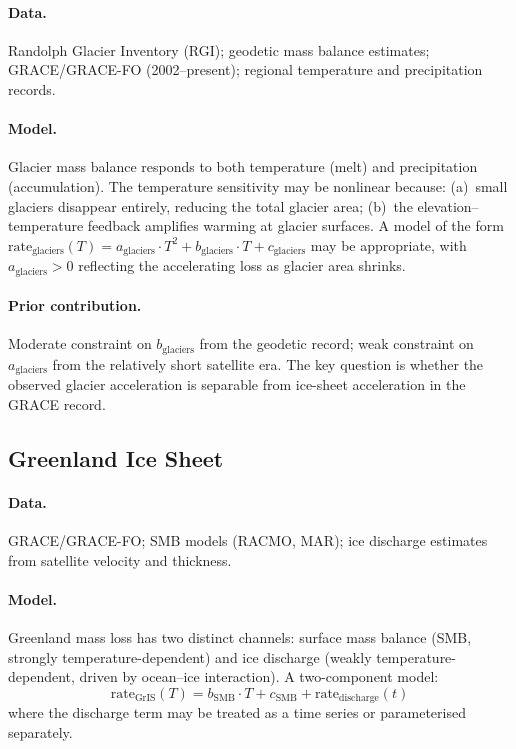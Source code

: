\documentclass[11pt]{article}
\begin{document}
\paragraph{Data.}  Randolph Glacier Inventory (RGI); geodetic mass balance estimates; GRACE/GRACE-FO (2002--present); regional temperature and precipitation records.

\paragraph{Model.}  Glacier mass balance responds to both temperature (melt) and precipitation (accumulation).  The temperature sensitivity may be nonlinear because: (a)~small glaciers disappear entirely, reducing the total glacier area; (b)~the elevation--temperature feedback amplifies warming at glacier surfaces.  A model of the form $\text{rate}_{\text{glaciers}}(T) = a_{\text{glaciers}} \cdot T^2 + b_{\text{glaciers}} \cdot T + c_{\text{glaciers}}$ may be appropriate, with $a_{\text{glaciers}} > 0$ reflecting the accelerating loss as glacier area shrinks.

\paragraph{Prior contribution.}  Moderate constraint on $b_{\text{glaciers}}$ from the geodetic record; weak constraint on $a_{\text{glaciers}}$ from the relatively short satellite era.  The key question is whether the observed glacier acceleration is separable from ice-sheet acceleration in the GRACE record.

\subsection{Greenland Ice Sheet}
\label{sec:gris}

\paragraph{Data.}  GRACE/GRACE-FO; SMB models (RACMO, MAR); ice discharge estimates from satellite velocity and thickness.

\paragraph{Model.}  Greenland mass loss has two distinct channels: surface mass balance (SMB, strongly temperature-dependent) and ice discharge (weakly temperature-dependent, driven by ocean--ice interaction).  A two-component model:
\begin{equation}
  \text{rate}_{\text{GrIS}}(T) = b_{\text{SMB}} \cdot T + c_{\text{SMB}} + \text{rate}_{\text{discharge}}(t)
\end{equation}
where the discharge term may be treated as a time series or parameterised separately.
\end{document}

